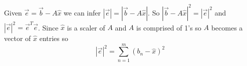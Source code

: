 			Given $\vec{e}=\vec{b}-A\hat{x}$ we can infer $|\vec{e}|=|\vec{b}-A\hat{x}|$. So $|\vec{b}-A\hat{x}|^2=|\vec{e}|^2$ and $|\vec{e}|^2=\vec{e}^T\vec{e}$. Since $\hat{x}$ is a scaler of $A$ and $A$ is comprised of 1's so $A$ becomes a vector of $\hat{x}$ entries so $$|\vec{e}|^2=\sum_{n=1}^{m}(b_n-\hat{x})^2$$
